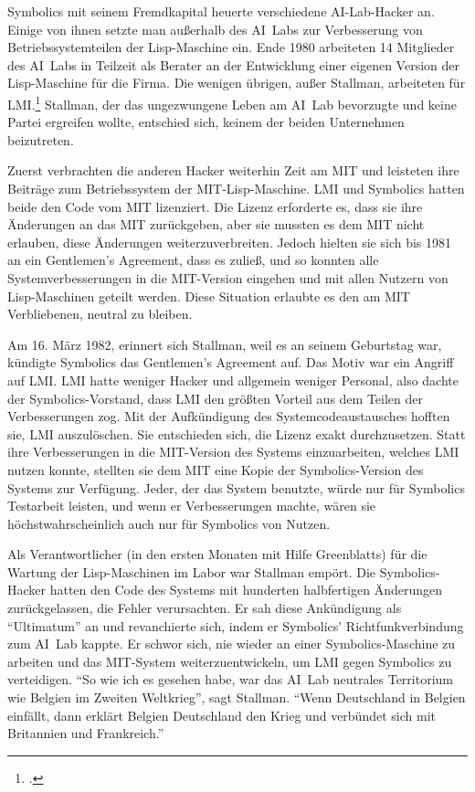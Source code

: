 Symbolics mit seinem Fremdkapital heuerte verschiedene AI-Lab-Hacker an. Einige von ihnen setzte man außerhalb des AI~Labs zur Verbesserung von Betriebssystemteilen der Lisp-Maschine ein. Ende 1980 arbeiteten 14 Mitglieder des AI~Labs in Teilzeit als Berater an der Entwicklung einer eigenen Version der Lisp-Maschine für die Firma. Die wenigen übrigen, außer Stallman, arbeiteten für LMI.\footcite[Vgl.][S.\,423]{hackers} Stallman, der das ungezwungene Leben am AI~Lab bevorzugte und keine Partei ergreifen wollte, entschied sich, keinem der beiden Unternehmen beizutreten.

Zuerst verbrachten die anderen Hacker weiterhin Zeit am MIT und leisteten ihre Beiträge zum Betriebssystem der MIT-Lisp-Maschine. LMI und Symbolics hatten beide den Code vom MIT lizenziert. Die Lizenz erforderte es, dass sie ihre Änderungen an das MIT zurückgeben, aber sie mussten es dem MIT nicht erlauben, diese Änderungen weiterzuverbreiten. Jedoch hielten sie sich bis 1981 an ein Gentlemen's Agreement, dass es zuließ, und so konnten alle Systemverbesserungen in die MIT-Version eingehen und mit allen Nutzern von Lisp-Maschinen geteilt werden. Diese Situation erlaubte es den am MIT Verbliebenen, neutral zu bleiben.

Am 16. März 1982, erinnert sich Stallman, weil es an seinem Geburtstag war, kündigte Symbolics das Gentlemen's Agreement auf. Das Motiv war ein Angriff auf LMI. LMI hatte weniger Hacker und allgemein weniger Personal, also dachte der Symbolics-Vorstand, dass LMI den größten Vorteil aus dem Teilen der Verbesserungen zog. Mit der Aufkündigung des Systemcodeaustausches hofften sie, LMI auszulöschen. Sie entschieden sich, die Lizenz exakt durchzusetzen. Statt ihre Verbesserungen in die MIT-Version des Systems einzuarbeiten, welches LMI nutzen konnte, stellten sie dem MIT eine Kopie der Symbolics-Version des Systems zur Verfügung. Jeder, der das System benutzte, würde nur für Symbolics Testarbeit leisten, und wenn er Verbesserungen machte, wären sie höchstwahrscheinlich auch nur für Symbolics von Nutzen.

Als Verantwortlicher (in den ersten Monaten mit Hilfe Greenblatts) für die Wartung der Lisp-Maschinen im Labor war Stallman empört. Die Symbolics-Hacker hatten den Code des Systems mit hunderten halbfertigen Änderungen zurückgelassen, die Fehler verursachten. Er sah diese Ankündigung als "`Ultimatum"' an und revanchierte sich, indem er Symbolics' Richtfunkverbindung zum AI~Lab kappte. Er schwor sich, nie wieder an einer Symbolics-Maschine zu arbeiten und das MIT-System weiterzuentwickeln, um LMI gegen Symbolics zu verteidigen. "`So wie ich es gesehen habe, war das AI~Lab neutrales Territorium wie Belgien im Zweiten Weltkrieg"', sagt Stallman. "`Wenn Deutschland in Belgien einfällt, dann erklärt Belgien Deutschland den Krieg und verbündet sich mit Britannien und Frankreich."'

